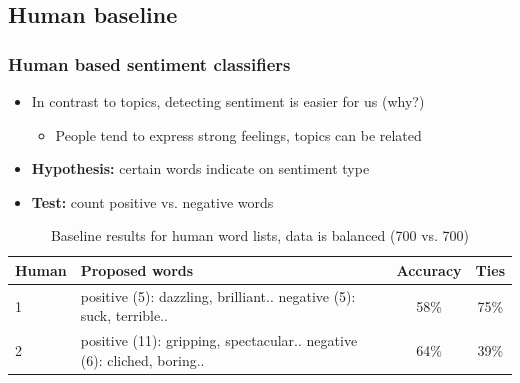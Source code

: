 \documentclass{beamer}
\begin{document}

\subsection{Human baseline}
\begin{frame}
	\frametitle{Human based sentiment classifiers}
	\begin{itemize}
		\item In contrast to topics, detecting sentiment is easier for us (why?)
		\begin{itemize}
		
		\item People tend to express strong feelings, topics can be related
		\end{itemize}
		
		\item \textbf{Hypothesis:} certain words indicate on sentiment type
		
		\item \textbf{Test:} count positive vs. negative words
	\end{itemize}
	
	\begin{table}
		\scriptsize
		\begin{tabular}{ l | p{5cm} | c | c }
			Human & Proposed words & Accuracy & Ties \footnotemark \\ \hline \hline
			1 & positive (5): dazzling, brilliant.. \newline negative (5): suck, terrible.. & 58\% & 75\% \\ \hline
			2 & positive (11): gripping, spectacular.. \newline negative (6): cliched, boring.. & 64\% & 39\%  \\  \hline
		\end{tabular}
		\caption{Baseline results for human word lists, data is balanced (700 vs. 700)}
	\end{table}
	
\end{frame}
\end{document}
